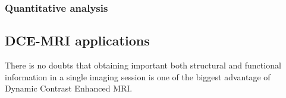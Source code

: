 \subsubsection{Quantitative analysis}

\subsection{DCE-MRI applications}
There is no doubts that obtaining important both structural and functional information in a single imaging session is one of the biggest advantage of Dynamic Contrast Enhanced MRI.